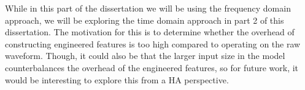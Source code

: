 \documentclass[logo,bsc,singlespacing,parskip,online]{infthesis}
\begin{document}
While in this part of the dissertation we will be using the frequency domain approach,
we will be exploring the time domain approach in part 2 of this dissertation. 
The motivation for this is to determine whether the overhead of constructing engineered features is too high compared to operating on the raw waveform. 
Though, it could also be that the larger input size in the model counterbalances the overhead of the engineered features, so 
for future work, it would be interesting to explore this from a HA perspective.



\end{document}

